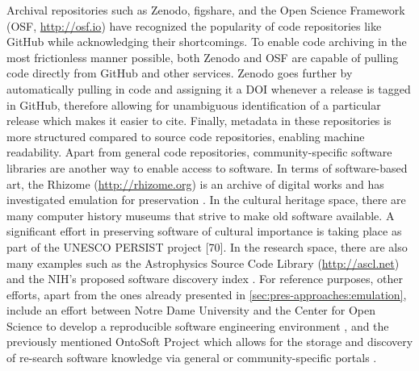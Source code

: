 \documentclass[letterpaper,11pt]{article}
\begin{document}
Archival repositories such as Zenodo, figshare, and the Open Science Framework (OSF, \url{http://osf.io}) have recognized the popularity of code repositories like GitHub while acknowledging their shortcomings. To enable code archiving in the most frictionless manner possible, both Zenodo and OSF are capable of pulling code directly from GitHub and other services. Zenodo goes further by automatically pulling in code and assigning it a DOI whenever a release is tagged in GitHub, therefore allowing for unambiguous identification of a particular release which makes it easier to cite. Finally, metadata in these repositories is more structured compared to source code repositories, enabling machine readability.
Apart from general code repositories, community-specific software libraries are another way to enable access to software. In terms of software-based art, the Rhizome (\url{http://rhizome.org}) is an archive of digital works and has investigated emulation for preservation \citep{mckeehan2016}. In the cultural heritage space, there are many computer history museums that strive to make old software available. A significant effort in preserving software of cultural importance is taking place as part of the UNESCO PERSIST project [70]. In the research space, there are also many examples such as the Astrophysics Source Code Library (\url{http://ascl.net}) and the NIH’s proposed software discovery index \citep{bonazzi2015}. For reference purposes, other efforts, apart from the ones already presented in \cref{sec:pres-approaches:emulation}, include an effort between Notre Dame University and the Center for Open Science to develop a reproducible software engineering environment \citep{centeropenscience2016}, and the previously mentioned OntoSoft Project which allows for the storage and discovery of re-search software knowledge via general or community-specific portals \citep{gil2015}. 
\end{document}
